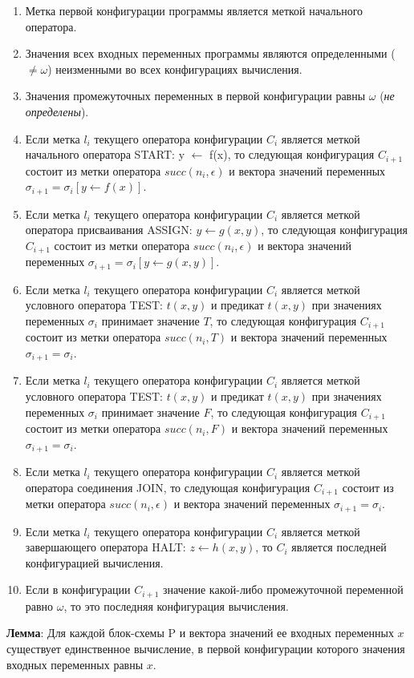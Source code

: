 \begin{enumerate}
    \item Метка первой конфигурации программы является меткой начального оператора.
    \item Значения всех входных переменных программы являются определенными ($\neq \omega$)  неизменными во всех конфигурациях вычисления.
    \item Значения промежуточных переменных в первой конфигурации равны $\omega$ (\textit{не определены}).
    \item Если метка $\textit{l}_i$ текущего оператора конфигурации $C_i$ является меткой начального оператора START: y $\leftarrow$ f(x), то следующая конфигурация $C_{i+1}$ состоит из метки оператора $succ(n_i, \epsilon)$ и вектора значений переменных $\sigma_{i+1} = \sigma_i[y \leftarrow f(x)]$.
    \item Если метка $\textit{l}_i$ текущего оператора конфигурации $C_i$ является меткой оператора присваивания ASSIGN: $y \leftarrow g(x, y)$, то следующая конфигурация $C_{i+1}$ состоит из метки оператора $succ(n_i, \epsilon)$ и вектора значений переменных $\sigma_{i+1} = \sigma_i[y \leftarrow g(x, y)]$.
    \item Если метка $\textit{l}_i$ текущего оператора конфигурации $C_i$ является меткой условного оператора TEST: $t(x, y)$ и предикат $t(x, y)$ при значениях переменных $\sigma_i$ принимает значение $T$, то следующая конфигурация $C_{i+1}$ состоит из метки оператора $succ(n_i, T)$ и вектора значений переменных $\sigma_{i+1} = \sigma_i$.
    \item Если метка $\textit{l}_i$ текущего оператора конфигурации $C_i$ является меткой условного оператора TEST: $t(x, y)$ и предикат $t(x, y)$ при значениях переменных $\sigma_i$ принимает значение $F$, то следующая конфигурация $C_{i+1}$ состоит из метки оператора $succ(n_i, F)$ и вектора значений переменных $\sigma_{i+1} = \sigma_i$.
    \item Если метка $\textit{l}_i$ текущего оператора конфигурации $C_i$ является меткой оператора соединения JOIN, то следующая конфигурация $C_{i+1}$ состоит из метки оператора $succ(n_i, \epsilon)$ и вектора значений переменных $\sigma_{i+1} = \sigma_i$.
    \item Если метка $\textit{l}_i$ текущего оператора конфигурации $C_i$ является меткой завершающего оператора HALT: $z \leftarrow h(x, y)$, то $C_i$ является последней конфигурацией вычисления.
    \item Если в конфигурации $C_{i+1}$ значение какой-либо промежуточной переменной равно $\omega$, то это последняя конфигурация вычисления.
\end{enumerate}

\textbf{Лемма}: Для каждой блок-схемы P и вектора значений ее входных переменных $x$ существует единственное вычисление, в первой конфигурации которого значения входных переменных равны $x$.

